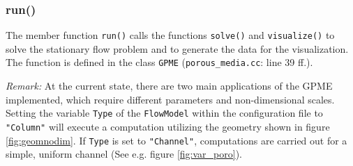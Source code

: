 \documentclass{article}
\begin{document}
\subsubsection{run()}
\label{sec:run()}

The member function \texttt{run()} calls the functions \texttt{solve()} and \texttt{visualize()} to solve the stationary
flow problem and to generate the data for the visualization. The function is defined in the class
\texttt{GPME} (\texttt{porous\_media.cc}: line 39 ff.).

\emph{Remark:}
At the current state, there are two main applications of the GPME implemented, which require different parameters and non-dimensional scales. Setting the variable \texttt{Type} of the \texttt{FlowModel} within the configuration file to \lstinline{"Column"} will execute a computation utilizing the geometry shown in figure \ref{fig:geomnodim}. If \texttt{Type} is set to \lstinline{"Channel"}, computations are carried out for a simple, uniform channel (See e.g. figure \ref{fig:var_poro}).
\end{document}
